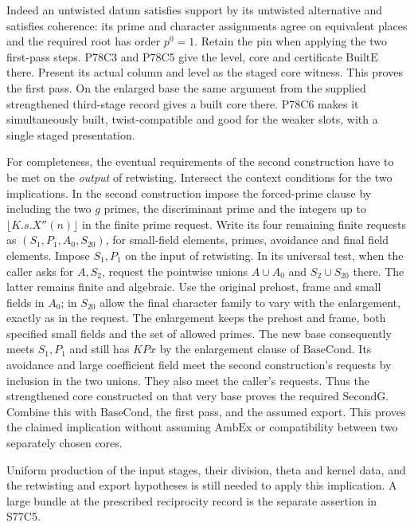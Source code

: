 Indeed an untwisted datum satisfies support by its untwisted
alternative and satisfies coherence: its prime and character
assignments agree on equivalent places and the required root has
order $p^0=1$. Retain the pin when applying the two first-pass
steps. P78C3 and P78C5 give the level, core and certificate
$\mathrm{BuiltE}$ there. Present its actual column and level as
the staged core witness. This proves the first pass. On the
enlarged base the same argument from the supplied strengthened
third-stage record gives a built core there. P78C6 makes it
simultaneously built, twist-compatible and good for the weaker
slots, with a single staged presentation.

For completeness, the eventual requirements of the second
construction have to be met on the \emph{output} of retwisting.
Intersect the context conditions for the two implications.
In the second construction impose the forced-prime clause by
including the two $g$ primes, the discriminant prime and the
integers up to $\lfloor K.s.X''(n)\rfloor$ in the finite prime
request. Write its four remaining finite requests as
$(S_1,P_1,A_0,S_{20})$, for small-field elements, primes,
avoidance and final field elements. Impose $S_1,P_1$ on the
input of retwisting. In its universal test, when the caller
asks for $A,S_2$, request the pointwise unions
$A\cup A_0$ and $S_2\cup S_{20}$ there. The latter remains
finite and algebraic. Use the original prehost, frame and small
fields in $A_0$; in $S_{20}$ allow the final character family
to vary with the enlargement, exactly as in the request.
The enlargement keeps the prehost and frame, both specified small
fields and the set of allowed primes. The new base consequently
meets $S_1,P_1$ and still has $KPx$ by the enlargement clause of
$\mathrm{BaseCond}$. Its avoidance and large coefficient field
meet the second construction's requests by inclusion in the
two unions. They also meet the caller's requests. Thus the
strengthened core constructed on that very base proves the
required $\mathrm{SecondG}$. Combine this with $\mathrm{BaseCond}$,
the first pass, and the assumed export. This proves the claimed
implication without assuming $\mathrm{AmbEx}$ or compatibility
between two separately chosen cores.

Uniform production of the input stages, their division, theta
and kernel data, and the retwisting and export hypotheses is
still needed to apply this implication. A large bundle at the
prescribed reciprocity record is the separate assertion in S77C5.

